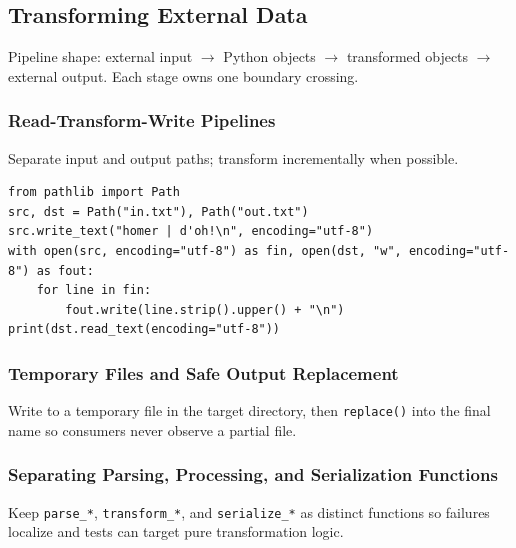 \subsection{Transforming External Data}

Pipeline shape: external input $\rightarrow$ Python objects $\rightarrow$ transformed objects $\rightarrow$ external output. Each stage owns one boundary crossing.

\subsubsection{Read-Transform-Write Pipelines}

Separate input and output paths; transform incrementally when possible.

\begin{verbatim}
from pathlib import Path
src, dst = Path("in.txt"), Path("out.txt")
src.write_text("homer | d'oh!\n", encoding="utf-8")
with open(src, encoding="utf-8") as fin, open(dst, "w", encoding="utf-8") as fout:
    for line in fin:
        fout.write(line.strip().upper() + "\n")
print(dst.read_text(encoding="utf-8"))
\end{verbatim}

\subsubsection{Temporary Files and Safe Output Replacement}

Write to a temporary file in the target directory, then \texttt{replace()} into the final name so consumers never observe a partial file.

\subsubsection{Separating Parsing, Processing, and Serialization Functions}

Keep \texttt{parse\_*}, \texttt{transform\_*}, and \texttt{serialize\_*} as distinct functions so failures localize and tests can target pure transformation logic.
